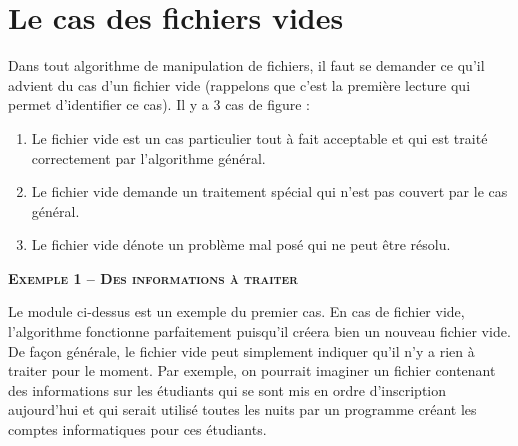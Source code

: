 


		
		
		
		


\section{Le cas des fichiers vides}

Dans tout algorithme de manipulation de fichiers, il faut se demander ce
qu'il advient du cas d'un fichier
vide (rappelons que c'est la première lecture qui
permet d'identifier ce cas). Il y a 3 cas de figure :

\begin{enumerate}
	\item 
		Le fichier vide est un cas particulier tout à fait acceptable et qui est
		traité correctement par l'algorithme général.
	\item 
		Le fichier vide demande un traitement spécial qui n'est
		pas couvert par le cas général.
	\item 
		Le fichier vide dénote un problème mal posé qui ne peut être résolu.
\end{enumerate}

{\sffamily\bfseries\scshape
Exemple 1 – Des informations à traiter}

Le module  ci-dessus est un exemple du
premier cas. En cas de fichier vide, l'algorithme
fonctionne parfaitement puisqu'il créera bien un
nouveau fichier vide. De façon générale, le fichier vide peut
simplement indiquer qu'il n'y a rien
à traiter pour le moment. Par exemple, on pourrait imaginer un fichier
contenant des informations sur les étudiants qui se sont mis en ordre
d'inscription aujourd'hui et qui
serait utilisé toutes les nuits par un programme créant les comptes
informatiques pour ces étudiants. 

